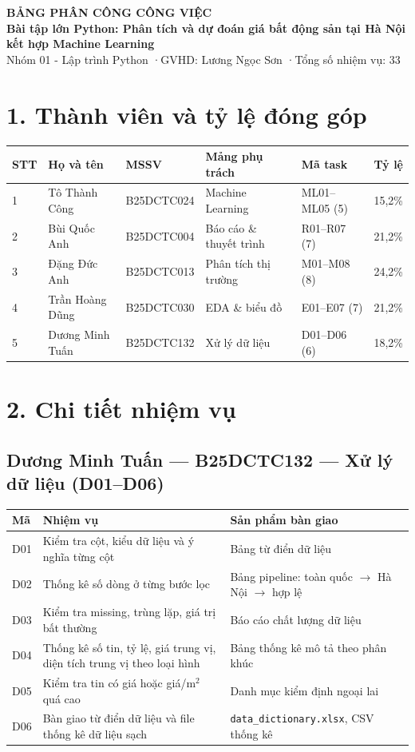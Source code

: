 \documentclass[10pt,a4paper]{article}
\newcommand{\mem}[1]{\subsection*{#1}\vspace{-2pt}}
\begin{document}
\begin{center}
{\Large\bfseries\color{ptitblue} BẢNG PHÂN CÔNG CÔNG VIỆC}\\[4pt]
\textbf{Bài tập lớn Python: Phân tích và dự đoán giá bất động sản tại Hà Nội kết hợp Machine Learning}\\
Nhóm 01 - Lập trình Python \quad·\quad GVHD: Lương Ngọc Sơn \quad·\quad Tổng số nhiệm vụ: 33
\end{center}

\section*{1. Thành viên và tỷ lệ đóng góp}
\small
\begin{longtable}{@{}p{.35cm}p{3.1cm}p{2.05cm}p{3.5cm}p{1.7cm}r@{}}
\toprule
\textbf{STT} & \textbf{Họ và tên} & \textbf{MSSV} & \textbf{Mảng phụ trách} & \textbf{Mã task} & \textbf{Tỷ lệ}\\\midrule
1 & Tô Thành Công & B25DCTC024 & Machine Learning & ML01--ML05 (5) & 15,2\%\\
2 & Bùi Quốc Anh & B25DCTC004 & Báo cáo \& thuyết trình & R01--R07 (7) & 21,2\%\\
3 & Đặng Đức Anh & B25DCTC013 & Phân tích thị trường & M01--M08 (8) & 24,2\%\\
4 & Trần Hoàng Dũng & B25DCTC030 & EDA \& biểu đồ & E01--E07 (7) & 21,2\%\\
5 & Dương Minh Tuấn & B25DCTC132 & Xử lý dữ liệu & D01--D06 (6) & 18,2\%\\\bottomrule
\end{longtable}

\section*{2. Chi tiết nhiệm vụ}
\footnotesize
\mem{Dương Minh Tuấn --- B25DCTC132 --- Xử lý dữ liệu (D01--D06)}
\begin{longtable}{@{}p{.9cm}p{8.3cm}p{6.2cm}@{}}
\toprule\textbf{Mã} & \textbf{Nhiệm vụ} & \textbf{Sản phẩm bàn giao}\\\midrule\endhead
D01 & Kiểm tra cột, kiểu dữ liệu và ý nghĩa từng cột & Bảng từ điển dữ liệu\\
D02 & Thống kê số dòng ở từng bước lọc & Bảng pipeline: toàn quốc $\to$ Hà Nội $\to$ hợp lệ\\
D03 & Kiểm tra missing, trùng lặp, giá trị bất thường & Báo cáo chất lượng dữ liệu\\
D04 & Thống kê số tin, tỷ lệ, giá trung vị, diện tích trung vị theo loại hình & Bảng thống kê mô tả theo phân khúc\\
D05 & Kiểm tra tin có giá hoặc giá/m$^2$ quá cao & Danh mục kiểm định ngoại lai\\
D06 & Bàn giao từ điển dữ liệu và file thống kê dữ liệu sạch & \texttt{data\_dictionary.xlsx}, CSV thống kê\\\bottomrule
\end{longtable}
\end{document}
